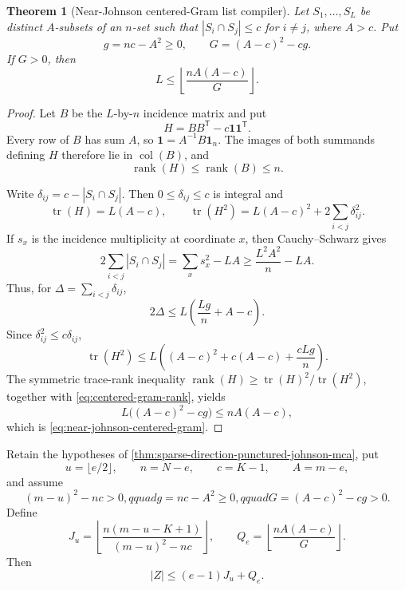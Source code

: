 \documentclass[11pt,a4paper]{amsart}
\numberwithin{equation}{section}
\newtheorem{theorem}{Theorem}[section]
\theoremstyle{remark}
\begin{document}
\begin{theorem}[Near-Johnson centered-Gram list compiler]
\label{thm:near-johnson-centered-gram}
Let \(S_1,\ldots,S_L\) be distinct \(A\)-subsets of an \(n\)-set such
that \(|S_i\cap S_j|\le c\) for \(i\ne j\), where \(A>c\).  Put
\[
  g=nc-A^2\ge0,
  \qquad
  G=(A-c)^2-cg.
\]
If \(G>0\), then
\begin{equation}
  L\le\left\lfloor\frac{nA(A-c)}{G}\right\rfloor.
  \label{eq:near-johnson-centered-gram}
\end{equation}
\end{theorem}

\begin{proof}
Let \(B\) be the \(L\)-by-\(n\) incidence matrix and put
\[
  H=BB^{\mathsf T}-c\mathbf1\mathbf1^{\mathsf T}.
\]
Every row of \(B\) has sum \(A\), so
\(\mathbf1=A^{-1}B\mathbf1_n\).  The images of both summands defining
\(H\) therefore lie in \(\operatorname{col}(B)\), and
\begin{equation}
  \operatorname{rank}(H)\le\operatorname{rank}(B)\le n.
  \label{eq:centered-gram-rank}
\end{equation}

Write \(\delta_{ij}=c-|S_i\cap S_j|\).  Then
\(0\le\delta_{ij}\le c\) is integral and
\[
 \operatorname{tr}(H)=L(A-c),\qquad
 \operatorname{tr}(H^2)=L(A-c)^2+2\sum_{i<j}\delta_{ij}^2.
\]
If \(s_x\) is the incidence multiplicity at coordinate \(x\), then
Cauchy--Schwarz gives
\[
 2\sum_{i<j}|S_i\cap S_j|
 =\sum_xs_x^2-LA
 \ge \frac{L^2A^2}{n}-LA.
\]
Thus, for \(\Delta=\sum_{i<j}\delta_{ij}\),
\[
 2\Delta\le L\left(\frac{Lg}{n}+A-c\right).
\]
Since \(\delta_{ij}^2\le c\delta_{ij}\),
\[
 \operatorname{tr}(H^2)
 \le L\left((A-c)^2+c(A-c)+\frac{cLg}{n}\right).
\]
The symmetric trace-rank inequality
\(\operatorname{rank}(H)\ge\operatorname{tr}(H)^2/
\operatorname{tr}(H^2)\), together with
\eqref{eq:centered-gram-rank}, yields
\[
  L\bigl((A-c)^2-cg\bigr)\le nA(A-c),
\]
which is \eqref{eq:near-johnson-centered-gram}.
\end{proof}

\begin{corollary}
\label{cor:sparse-direction-near-johnson-mca}
Retain the hypotheses of
\cref{thm:sparse-direction-punctured-johnson-mca}, put
\[
 u=\lfloor e/2\rfloor,
 \qquad n=N-e,
 \qquad c=K-1,
 \qquad A=m-e,
\]
and assume
\[
 (m-u)^2-nc>0,qquad
 g=nc-A^2\ge0,qquad
 G=(A-c)^2-cg>0.
\]
Define
\[
 J_u=\left\lfloor\frac{n(m-u-K+1)}{(m-u)^2-nc}\right\rfloor,
 \qquad
 Q_e=\left\lfloor\frac{nA(A-c)}G\right\rfloor.
\]
Then
\begin{equation}
  |Z|\le(e-1)J_u+Q_e.                              \label{eq:near-johnson-mca}
\end{equation}
\end{corollary}
\end{document}

